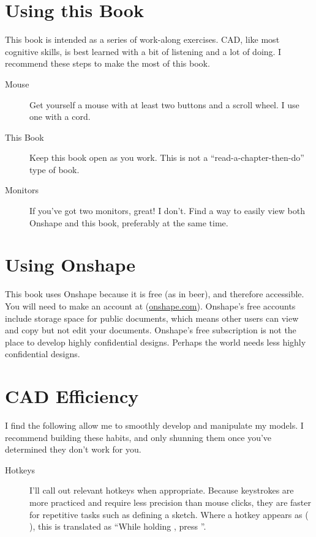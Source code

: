 \section{Using this Book}
This book is intended as a series of work-along exercises.
CAD, like most cognitive skills, is best learned with a
bit of listening and a lot of doing. I recommend these
steps to make the most of this book.

\begin{description}
\item[Mouse] Get yourself a mouse with at least two
buttons and a scroll wheel. I use one with a cord.
\item[This Book] Keep this book open as you work. This is
not a ``read-a-chapter-then-do'' type of book.
\item[Monitors] If you've got two monitors, great! I
don't. Find a way to easily view both Onshape and this book, preferably at the same time.
\end{description}

\section{Using Onshape}
This book uses Onshape because it
is free (as in beer), and therefore accessible. You
will need to make an account at (\url{onshape.com}).
Onshape's free accounts include storage space for public 
documents, which means other users can view and copy 
but not edit your documents. Onshape's free subscription
is not the place to develop highly confidential designs.
Perhaps the world needs less highly confidential designs.

\section{CAD Efficiency}
I find the following allow me to smoothly develop and manipulate my models. I recommend building these habits, and only shunning them once you've determined they don't work for you.

\begin{description}
\item[Hotkeys] I'll call out relevant hotkeys when appropriate. Because keystrokes are more practiced and require less precision than mouse clicks, they are faster for repetitive tasks such as defining a sketch. Where a hotkey appears as ( ), this is translated as ``While holding , press ''.
\end{description}
